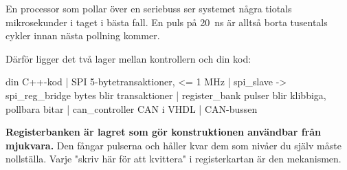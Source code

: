 En processor som pollar över en seriebuss ser systemet några tiotals mikrosekunder i taget i bästa
fall. En puls på 20~ns är alltså borta tusentals cykler innan nästa pollning kommer.

Därför ligger det två lager mellan kontrollern och din kod:

\begin{console}
                 din C++-kod
                      |
                     SPI                  5-bytetransaktioner, <= 1 MHz
                      |
   spi_slave  ->  spi_reg_bridge          bytes blir transaktioner
                      |
              register_bank               pulser blir klibbiga, pollbara bitar
                      |
              can_controller              CAN i VHDL
                      |
                  CAN-bussen
\end{console}

\textbf{Registerbanken är lagret som gör konstruktionen användbar från mjukvara.} Den fångar
pulserna och håller kvar dem som nivåer du själv måste nollställa. Varje "skriv  här för
att kvittera" i registerkartan är den mekanismen.
